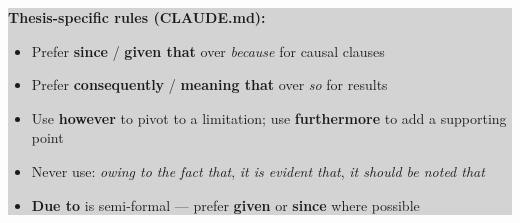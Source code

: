 \documentclass[11pt,a4paper]{article}
\begin{document}
\vspace{12pt}
\noindent\colorbox{lightgray}{%
  \parbox{\linewidth}{%
    \vspace{4pt}
    \textbf{\color{konstanzblue}Thesis-specific rules (CLAUDE.md):}
    \begin{itemize}\setlength\itemsep{1pt}
      \item Prefer \textbf{since} / \textbf{given that} over \textit{because} for causal clauses
      \item Prefer \textbf{consequently} / \textbf{meaning that} over \textit{so} for results
      \item Use \textbf{however} to pivot to a limitation; use \textbf{furthermore} to add a supporting point
      \item Never use: \textit{owing to the fact that}, \textit{it is evident that}, \textit{it should be noted that}
      \item \textbf{Due to} is semi-formal — prefer \textbf{given} or \textbf{since} where possible
    \end{itemize}
    \vspace{2pt}
  }%
}
\end{document}
